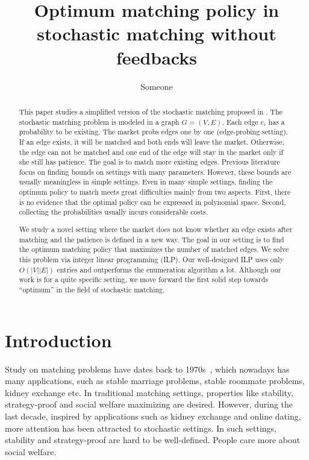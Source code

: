 \documentclass[letterpaper]{article}
\title {Optimum matching policy in stochastic matching without feedbacks}
\author {Someone}
\begin{document}
%

\maketitle
\begin{abstract}
This paper studies a simplified version of the stochastic matching proposed in \cite{chen2009approximating}.
The stochastic matching problem is modeled in a graph $G=(V,E)$. 
Each edge $e_i$ has a probability to be existing. 
The market probs edges one by one (edge-probing setting).
If an edge exists, it will be matched and both ends will leave the market.
Otherwise, the edge can not be matched and one end of the edge will stay in the market only if she still has patience.
The goal is to match more existing edges.
Previous literature focus on finding bounds on settings with many parameters.
However, these bounds are usually meaningless in simple settings.
Even in many simple settings, finding the optimum policy to match meets great difficulties mainly from two aspects.
First, there is no evidence that the optimal policy can be expressed in polynomial space.
Second, collecting the probabilities usually incurs considerable costs.

We study a novel setting where the market does not know whether an edge exists after matching and the patience is defined in a new way.
The goal in our setting is to find the optimum matching policy that maximizes the number of matched edges.
We solve this problem via integer linear programming (ILP).
Our well-designed ILP uses only $O(|V||E|)$ entries and outperforms the enumeration algorithm a lot.
Although our work is for a quite specific setting, we move forward the first solid step towards ``optimum'' in the field of stochastic matching.

\end{abstract}

\section{Introduction}

Study on matching problems have dates back to 1970s~\cite{keylist}, which nowadays has many applications, such as stable marriage problems, stable roommate problems, kidney exchange etc.
In traditional matching settings, properties like stability, strategy-proof and social welfare maximizing are desired.
However, during the last decade, inspired by applications such as kidney exchange and online dating, more attention has been attracted to stochastic settings.
In such settings, stability and strategy-proof are hard to be well-defined.
People care more about social welfare.
\end{document}
